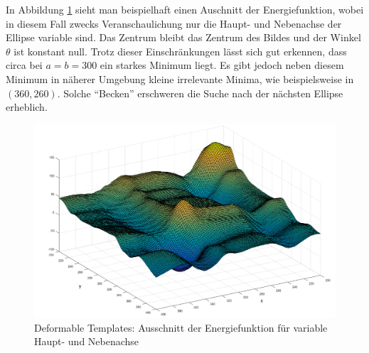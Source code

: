 In Abbildung \ref{fig:deformable} sieht man beispielhaft einen Auschnitt der Energiefunktion, wobei in diesem Fall zwecks Veranschaulichung nur die Haupt- und Nebenachse der Ellipse variable sind. Das Zentrum bleibt das Zentrum des Bildes und der Winkel $\theta$ ist konstant null. Trotz dieser Einschränkungen lässt sich gut erkennen, dass circa bei $a = b = 300$ ein starkes Minimum liegt. Es gibt jedoch neben diesem Minimum in näherer Umgebung kleine irrelevante Minima, wie beispielsweise in $(360, 260)$. Solche "`Becken"' erschweren die Suche nach der nächsten Ellipse erheblich.


\begin{figure}[!htb]
	\centering
	\includegraphics[scale=.4]{images/deformable.png}
	\caption{Deformable Templates: Ausschnitt der Energiefunktion für variable Haupt- und Nebenachse}
	\label{fig:deformable}
\end{figure}













